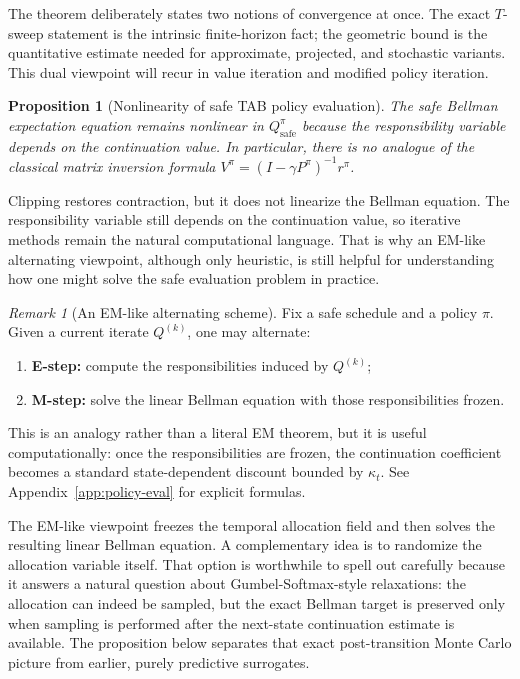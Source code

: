 \documentclass{article}
\newtheorem{proposition}[proposition]{Proposition}
\theoremstyle{remark}
\newtheorem{remark}[remark]{Remark}
\newcommand{\safe}{\mathrm{safe}}
\begin{document}
The theorem deliberately states two notions of convergence at once.
The exact $T$-sweep statement is the intrinsic finite-horizon fact; the geometric bound is the quantitative estimate needed for approximate, projected, and stochastic variants.
This dual viewpoint will recur in value iteration and modified policy iteration.


\begin{proposition}[Nonlinearity of safe TAB policy evaluation]
\label{prop:nonlinear}
The safe Bellman expectation equation remains nonlinear in $Q_\safe^\pi$ because the responsibility variable depends on the continuation value.
In particular, there is no analogue of the classical matrix inversion formula $V^\pi=(I-\gamma P^\pi)^{-1}r^\pi$.
\end{proposition}

Clipping restores contraction, but it does not linearize the Bellman equation.
The responsibility variable still depends on the continuation value, so iterative methods remain the natural computational language.
That is why an EM-like alternating viewpoint, although only heuristic, is still helpful for understanding how one might solve the safe evaluation problem in practice.


\begin{remark}[An EM-like alternating scheme]
\label{rem:em-analogy}
Fix a safe schedule and a policy $\pi$.
Given a current iterate $Q^{(k)}$, one may alternate:
\begin{enumerate}[leftmargin=1.5em,itemsep=2pt]
    \item \textbf{E-step:} compute the responsibilities induced by $Q^{(k)}$;
    \item \textbf{M-step:} solve the linear Bellman equation with those responsibilities frozen.
\end{enumerate}
This is an analogy rather than a literal EM theorem, but it is useful computationally: once the responsibilities are frozen, the continuation coefficient becomes a standard state-dependent discount bounded by $\kappa_t$.
See Appendix~\ref{app:policy-eval} for explicit formulas.
\end{remark}

The EM-like viewpoint freezes the temporal allocation field and then solves the resulting linear Bellman equation.
A complementary idea is to randomize the allocation variable itself.
That option is worthwhile to spell out carefully because it answers a natural question about Gumbel-Softmax-style relaxations: the allocation can indeed be sampled, but the exact Bellman target is preserved only when sampling is performed after the next-state continuation estimate is available.
The proposition below separates that exact post-transition Monte Carlo picture from earlier, purely predictive surrogates.
\end{document}
